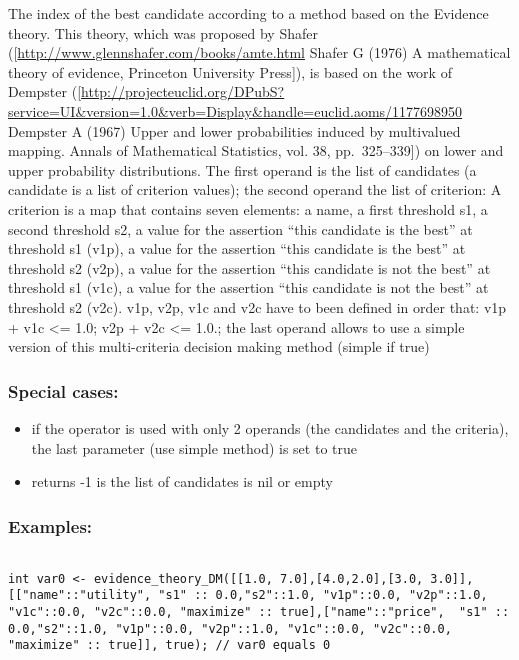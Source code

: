\documentclass[]{book}
\providecommand{\tightlist}{%
  \setlength{\itemsep}{0pt}\setlength{\parskip}{0pt}}
\theoremstyle{definition}
\theoremstyle{definition}
\theoremstyle{definition}
\theoremstyle{remark}
\begin{document}
The index of the best candidate according to a method based on the
Evidence theory. This theory, which was proposed by Shafer
({[}\url{http://www.glennshafer.com/books/amte.html} Shafer G (1976) A
mathematical theory of evidence, Princeton University Press{]}), is
based on the work of Dempster
({[}\url{http://projecteuclid.org/DPubS?service=UI\&version=1.0\&verb=Display\&handle=euclid.aoms/1177698950}
Dempster A (1967) Upper and lower probabilities induced by multivalued
mapping. Annals of Mathematical Statistics, vol. 38, pp.~325--339{]}) on
lower and upper probability distributions. The first operand is the list
of candidates (a candidate is a list of criterion values); the second
operand the list of criterion: A criterion is a map that contains seven
elements: a name, a first threshold s1, a second threshold s2, a value
for the assertion ``this candidate is the best'' at threshold s1 (v1p),
a value for the assertion ``this candidate is the best'' at threshold s2
(v2p), a value for the assertion ``this candidate is not the best'' at
threshold s1 (v1c), a value for the assertion ``this candidate is not
the best'' at threshold s2 (v2c). v1p, v2p, v1c and v2c have to been
defined in order that: v1p + v1c \textless{}= 1.0; v2p + v2c
\textless{}= 1.0.; the last operand allows to use a simple version of
this multi-criteria decision making method (simple if true)

\subsubsection{Special cases:}\label{special-cases-57}

\begin{itemize}
\tightlist
\item
  if the operator is used with only 2 operands (the candidates and the
  criteria), the last parameter (use simple method) is set to true\\
\item
  returns -1 is the list of candidates is nil or empty
\end{itemize}

\subsubsection{Examples:}\label{examples-118}

\begin{verbatim}
 
int var0 <- evidence_theory_DM([[1.0, 7.0],[4.0,2.0],[3.0, 3.0]], [["name"::"utility", "s1" :: 0.0,"s2"::1.0, "v1p"::0.0, "v2p"::1.0, "v1c"::0.0, "v2c"::0.0, "maximize" :: true],["name"::"price",  "s1" :: 0.0,"s2"::1.0, "v1p"::0.0, "v2p"::1.0, "v1c"::0.0, "v2c"::0.0, "maximize" :: true]], true); // var0 equals 0
\end{verbatim}
\end{document}
